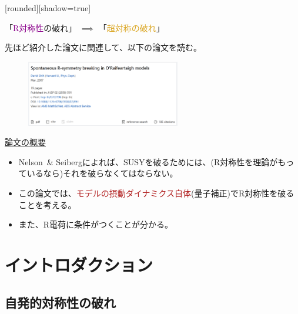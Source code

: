 \documentclass[
  unicode,a4paper,9pt,
  xcolor = {dvipsnames,svgnames},
  hyperref ={colorlinks=true,citecolor=Navy,linkcolor=NavyBlue,urlcolor=purple},
  ja=standard,lualatex
]{beamer}
\begin{document}
\begin{frame}
  [rounded][shadow=true]
  \begin{block}{}
    \centering
    「\textcolor{DarkMagenta}{R対称性}の破れ」
    $\implies$
    「\textcolor{Goldenrod}{超対称の破れ}」
  \end{block}

  先ほど紹介した論文に関連して、以下の論文を読む\cite{Shih:2007av}。

  \begin{figure}
    \centering
    \includegraphics[width=0.6\textwidth]{fig/Shih2007av.PNG}
  \end{figure}

  \uline{論文の概要}

  \begin{itemize}
    \item
          Nelson\ \& Seibergによれば、SUSYを破るためには、(R対称性を理論がもっているなら)それを破らなくてはならない。
    \item
          この論文では、\textcolor{FireBrick}{モデルの摂動ダイナミクス自体}(量子補正)でR対称性を破ることを考える。
    \item
          また、R電荷に条件がつくことが分かる。
  \end{itemize}

\end{frame}


\section{イントロダクション}

\begin{frame}[plain]
  \huge \secname
\end{frame}


\subsection{自発的対称性の破れ}
\end{document}
